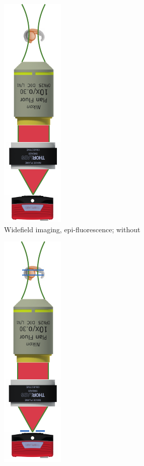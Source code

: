 \begin{figure}
	\centering
    \begin{subfigure}[t]{0.3\textwidth}
        \centering
        \includegraphics{epi_con_lsfm/widefield}
        \caption{Widefield imaging, epi-fluorescence; without }\label{fig:epi_con_lsfm/widefield}
    \end{subfigure}
    \hfill%
    \begin{subfigure}[t]{0.3\textwidth}
        \centering
        \includegraphics{epi_con_lsfm/confocal}

\end{subfigure}
\end{figure}
